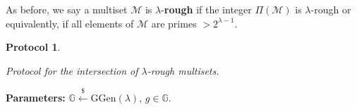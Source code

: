 \documentclass[11pt, lettersize, notitlepage, leqno, footskip=0.6cm]{article}
\newcommand{\bz}{\mathbb Z}
\newcommand{\slim}{\sum\limits}
\newcommand{\ttt}{\texttt}
\newcommand{\negl}{\ttt{{negl}}}
\newcommand{\imp}{\Longrightarrow}
\newcommand{\wti}{\widetilde}
\newcommand{\mc}{\mathcal}
\newcommand{\mb}{\mathbb}
\newcommand{\mbf}{\mathbf}
\newcommand{\mr}{\mathrm}
\newcommand{\lam}{\lambda}
\newcommand{\lamb}{\lambda}
\newcommand{\mcM}{\mc{M}}
\newcommand{\vs}{\vspace{-0.15cm}}
\newcommand{\noin}{\noindent}
\newcommand{\Mod}[1]{\ (\mathrm{mod}\ #1)}
\newcommand{\GCD}{\mbf{gcd}}
\newtheorem{Prot}[Thm]{Protocol}
\numberwithin{equation}{section}
\begin{document}
\begin{comment}
However, this is no longer true when the integers $\Pi(\mcM_i)$ have prime divisors of bit-size $< \lam$. While such a protocol would be \textit{sound} in the sense that a Prover could not forge a fake proof, it would not be \textit{correct}, meaning an honest Prover might not be able to efficiently generate a proof. To get around this problem, we use lemma \ref{integers}. 

For an arbitrary $\lam$-bit integer $\gamma$, consider the integer $\slim_{i=1}^n d_i^{n\lam}\gamma^i.$ If the Prover can demonstrate that $\GCD(\slim_{i=1}^n d_i^{n\lam}\gamma^i, d_i)= 1$, then it follows that $\GCD(d_1,\cdots,d_n) = 1$. So it boils down to the expected runtime for finding such an integer $\gamma$. 

For a randomly chosen $\gamma$, suppose we have \vs $$ e:= \GCD(\slim_{i=1}^n d_i\gamma^i, d_1) > 1 .$$ Let $p$ be any prime divisor of $e$. Since $p$ does not divide all of the coefficients of the polynomial $\slim_{i=1}^n d_i^{n\lam}X_i\in\bz[X]$, it follows that \vspace{-0.25cm} $$\ttt{Pr}\big[\slim_{i=1}^n d_i\gamma^i \equiv 0\Mod{p^{n\lam}} \big] = \negl(\lam).$$ The Prover can efficiently compute \vs $$e:= \GCD(\slim_{i=1}^n d_i\gamma^i, d_1)\;,\;\wti{e}:= \GCD(\slim_{i=1}^n d_i\gamma^i, e^{n\lam}).$$ He sends the commitments to these integers and demonstrates the relations between the discrete logarithms using the protocols $\ttt{PoGCD}$ and $\ttt{MultPolyDlog}$. Now, $$e^{n\lam-1}\equiv 0\Mod{\wti{e}} \imp \GCD(d_1,\cdots,d_n) = 1.$$ To see this, let $p$ be a prime dividing $\GCD(d_1,\cdots,d_n)$ and let $k$ be the largest integer such that $p^k$ divides $e$. Then $p^{kn\lam}$ divides every $d_i^{n\lam}$ and hence, $p^{kn\lam}$ divides $\wti{e}$. On the other hand, $p^{kn\lam}$ does not divide $e^{n\lam-1}$, a contradiction.  \end{comment} 


As before, we say a multiset $\mcM$ is $\lam$-\textbf{rough} if the integer $\Pi(\mcM)$ is $\lam$-rough or equivalently, if all elements of $\mcM$ are primes $> 2^{\lam-1}$.

\begin{Prot} \hypertarget{Int}{Protocol for the intersection of $\lam$-rough multisets.}\end{Prot} \vspace{-0.3cm}

\noin \textbf{Parameters:} $\mb{G}\xleftarrow{\$} \mr{GGen}(\lamb)$,\; $g\in \mb{G}$.
\end{document}
